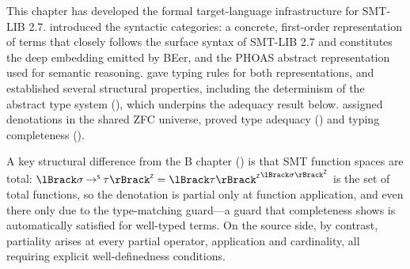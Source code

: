 This chapter has developed the formal target-language infrastructure for SMT-LIB 2.7.
 introduced the syntactic categories: a concrete, first-order
representation of terms that closely follows the surface syntax of SMT-LIB 2.7 and
constitutes the deep embedding emitted by BEer, and the PHOAS abstract representation used
for semantic reasoning.
 gave typing rules for both representations, and established
several structural properties, including the determinism of the abstract type system
(), which underpins the adequacy result below.
 assigned denotations in the shared ZFC universe, proved type
adequacy () and typing completeness
().

A key structural difference from the B chapter () is that SMT function
spaces are total: \(\interpZ{\sigma \toS \tau} = {\interpZ{\tau}}^{\interpZ{\sigma}}\)
is the set of total functions, so the denotation is partial only at function application,
and even there only due to the type-matching guard---a guard that completeness shows is
automatically satisfied for well-typed terms. On the source side, by contrast, partiality
arises at every partial operator, \eg application and cardinality,
all requiring explicit well-definedness conditions.
